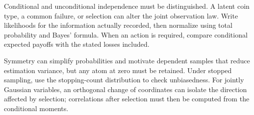 Conditional and unconditional independence must be distinguished. A latent coin type, a common failure, or selection can alter the joint observation law. Write likelihoods for the information actually recorded, then normalize using total probability and Bayes' formula. When an action is required, compare conditional expected payoffs with the stated losses included.

Symmetry can simplify probabilities and motivate dependent samples that reduce estimation variance, but any atom at zero must be retained. Under stopped sampling, use the stopping-count distribution to check unbiasedness. For jointly Gaussian variables, an orthogonal change of coordinates can isolate the direction affected by selection; correlations after selection must then be computed from the conditional moments.
\par\smallskip
